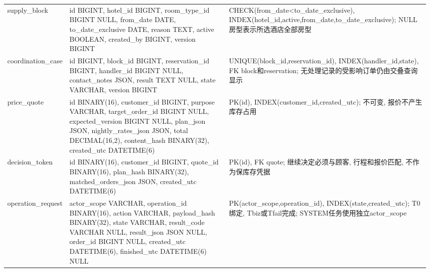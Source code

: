 \documentclass[cn,nofont,11pt,a4paper]{elegantpaper}
\begin{document}
\begin{longtable}{>{\RaggedRight\arraybackslash}p{}>{\RaggedRight\arraybackslash}p{}>{\RaggedRight\arraybackslash}p{}}
supply\_\allowbreak{}\allowbreak{}block & id BIGINT, hotel\_\allowbreak{}\allowbreak{}id BIGINT, room\_\allowbreak{}\allowbreak{}type\_\allowbreak{}\allowbreak{}id BIGINT NULL, from\_\allowbreak{}\allowbreak{}date DATE, to\_\allowbreak{}\allowbreak{}date\_\allowbreak{}\allowbreak{}exclusive DATE, reason TEXT, active BOOLEAN, created\_\allowbreak{}\allowbreak{}by BIGINT, version BIGINT & CHECK(from\_\allowbreak{}\allowbreak{}date<to\_\allowbreak{}\allowbreak{}date\_\allowbreak{}\allowbreak{}exclusive), INDEX(hotel\_\allowbreak{}\allowbreak{}id,active,from\_\allowbreak{}\allowbreak{}date,to\_\allowbreak{}\allowbreak{}date\_\allowbreak{}\allowbreak{}exclusive); NULL房型表示所选酒店全部房型 \\
coordination\_\allowbreak{}\allowbreak{}case & id BIGINT, block\_\allowbreak{}\allowbreak{}id BIGINT, reservation\_\allowbreak{}\allowbreak{}id BIGINT, handler\_\allowbreak{}\allowbreak{}id BIGINT NULL, contact\_\allowbreak{}\allowbreak{}notes JSON, result TEXT NULL, state VARCHAR, version BIGINT & UNIQUE(block\_\allowbreak{}\allowbreak{}id,reservation\_\allowbreak{}\allowbreak{}id), INDEX(handler\_\allowbreak{}\allowbreak{}id,state), FK block和reservation; 无处理记录的受影响订单仍由交叠查询显示 \\
price\_\allowbreak{}\allowbreak{}quote & id BINARY(16), customer\_\allowbreak{}\allowbreak{}id BIGINT, purpose VARCHAR, target\_\allowbreak{}\allowbreak{}order\_\allowbreak{}\allowbreak{}id BIGINT NULL, expected\_\allowbreak{}\allowbreak{}version BIGINT NULL, plan\_\allowbreak{}\allowbreak{}json JSON, nightly\_\allowbreak{}\allowbreak{}rates\_\allowbreak{}\allowbreak{}json JSON, total DECIMAL(16,2), content\_\allowbreak{}\allowbreak{}hash BINARY(32), created\_\allowbreak{}\allowbreak{}utc DATETIME(6) & PK(id), INDEX(customer\_\allowbreak{}\allowbreak{}id,created\_\allowbreak{}\allowbreak{}utc); 不可变, 报价不产生库存占用 \\
decision\_\allowbreak{}\allowbreak{}token & id BINARY(16), customer\_\allowbreak{}\allowbreak{}id BIGINT, quote\_\allowbreak{}\allowbreak{}id BINARY(16), plan\_\allowbreak{}\allowbreak{}hash BINARY(32), matched\_\allowbreak{}\allowbreak{}orders\_\allowbreak{}\allowbreak{}json JSON, created\_\allowbreak{}\allowbreak{}utc DATETIME(6) & PK(id), FK quote; 继续决定必须与顾客, 行程和报价匹配, 不作为保库存凭据 \\
operation\_\allowbreak{}\allowbreak{}request & actor\_\allowbreak{}\allowbreak{}scope VARCHAR, operation\_\allowbreak{}\allowbreak{}id BINARY(16), action VARCHAR, payload\_\allowbreak{}\allowbreak{}hash BINARY(32), state VARCHAR, result\_\allowbreak{}\allowbreak{}code VARCHAR NULL, result\_\allowbreak{}\allowbreak{}json JSON NULL, order\_\allowbreak{}\allowbreak{}id BIGINT NULL, created\_\allowbreak{}\allowbreak{}utc DATETIME(6), finished\_\allowbreak{}\allowbreak{}utc DATETIME(6) NULL & PK(actor\_\allowbreak{}\allowbreak{}scope,operation\_\allowbreak{}\allowbreak{}id), INDEX(state,created\_\allowbreak{}\allowbreak{}utc); T0绑定, Tbiz或Tfail完成; SYSTEM任务使用独立actor\_\allowbreak{}\allowbreak{}scope \\

\end{longtable}
\end{document}
